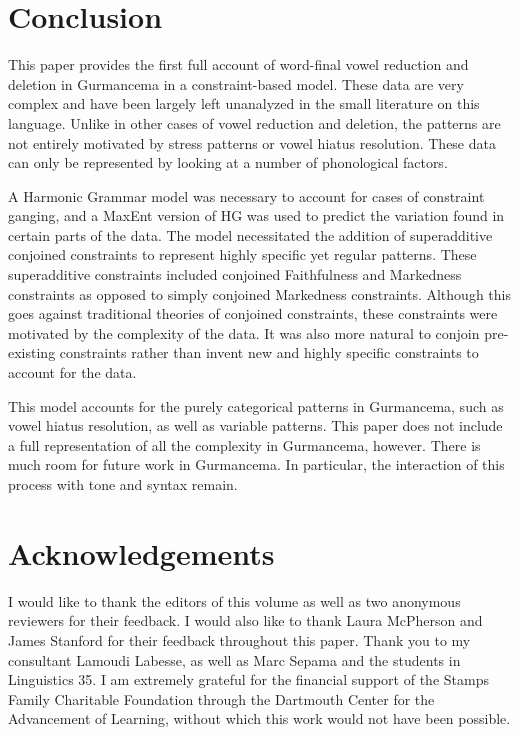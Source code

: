 \documentclass[output=paper,newtxmath,modfonts,nonflat,draftmode]{langsci/langscibook}
\begin{document}
\section{Conclusion}\label{sec:baird:6}

This paper provides the first full account of word-final vowel reduction and deletion in Gurmancema in a constraint-based model. These data are very complex and have been largely left unanalyzed in the small literature on this language. Unlike in other cases of vowel reduction and deletion, the patterns are not entirely motivated by stress patterns or vowel hiatus resolution. These data can only be represented by looking at a number of phonological factors.  
	
A Harmonic Grammar model was necessary to account for cases of constraint ganging, and a MaxEnt version of HG was used to predict the variation found in certain parts of the data. The model necessitated the addition of superadditive conjoined constraints to represent highly specific yet regular patterns. These superadditive constraints included conjoined Faithfulness and Markedness constraints as opposed to simply conjoined Markedness constraints. Although this goes against traditional theories of conjoined constraints, these constraints were motivated by the complexity of the data. It was also more natural to conjoin pre-existing constraints rather than invent new and highly specific constraints to account for the data.   

This model accounts for the purely categorical patterns in Gurmancema, such as vowel hiatus resolution, as well as variable patterns. This paper does not include a full representation of all the complexity in Gurmancema, however. There is much room for future work in Gurmancema. In particular, the interaction of this process with tone and syntax remain. 

\section*{Acknowledgements}

I would like to thank the editors of this volume as well as two anonymous reviewers for their feedback. I would also like to thank Laura McPherson and James Stanford for their feedback throughout this paper. Thank you to my consultant Lamoudi Labesse, as well as Marc Sepama and the 
students in Linguistics 35. I am extremely grateful for the financial support of the Stamps Family Charitable Foundation through the Dartmouth Center for the Advancement of 
Learning, without which this work would not have been possible. 
\end{document}
